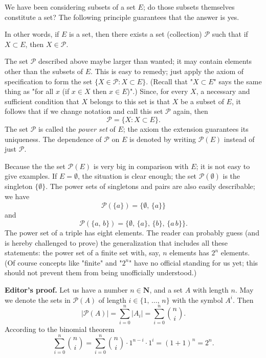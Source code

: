 We have been considering subsets of a set $E$; do those subsets themselves constitute a set? The following principle guarantees that the answer is yes.


In other words, if $E$ is a set, then there exists a set (collection) $\mathcal{P}$ such that if $X \subset E$, then $X \in \mathcal{P}$.

The set $\mathcal{P}$ described above maybe larger than wanted; it may contain elements other than the subsets of $E$. This is easy to remedy; just apply the axiom of specification to form the set $\{X \in \mathcal{P} : X \subset E\}$. (Recall that "$X \subset E$" says the same thing as "for all $x$ (if $x \in X$ then $x \in E$)".) Since, for every $X$, a necessary and sufficient condition that $X$ belongs to this set is that $X$ be a subset of $E$, it follows that if we change notation and call this set $\mathcal{P}$ again, then
\[
	\mathcal{P} = \{ X : X \subset E\}.
\]
The set $\mathcal{P}$ is called the \textit{power set} of $E$; the axiom the extension guarantees its uniqueness. The dependence of $\mathcal{P}$ on $E$ is denoted by writing $\mathcal{P}(E)$ instead of just $\mathcal{P}$.

Because the the set $\mathcal{P}(E)$ is very big in comparison with $E$; it is not easy to give examples. If $E = \emptyset$, the situation is clear enough; the set $\mathcal{P}(\emptyset)$ is the singleton $\{\emptyset\}$. The power sets of singletons and pairs are also easily describable; we have
\[
	\mathcal{P}(\{a\}) = \{\emptyset, \, \{a\}\}
\]
and
\[
	\mathcal{P}(\{a, \, b\}) = \{ \emptyset, \, \{a\}, \, \{b\}, \, \{a \, b\}\}.
\]
The power set of a triple has eight elements. The reader can probably guess (and is hereby challenged to prove) the generalization that includes all these statements: the power set of a finite set with, say, $n$ elements has $2^n$ elements. (Of course concepts like "finite" and "$2^n$" have no official standing for us yet; this should not prevent them from being unofficially understood.)

\textbf{Editor's proof.} Let us have a number $n \in \mathbf{N}$, and a set $A$ with length $n$. May we denote the sets in $\mathcal{P}(A)$ of length $i \in \{ 1, \, \dots, \, n\}$ with the symbol $A^i$. Then 
\[
	|\mathcal{P}(A)| = \sum_{i = 0}^{n} |A_i| = \sum_{i = 0}^{n} \binom{n}{i}.
\]
According to the binomial theorem
\[
	\sum_{i=0}^n \binom{n}{i} = \sum_{i=0}^n \binom{n}{i}\cdot 1^{n-i} \cdot 1^i = (1+1)^n = 2^n.
\]

